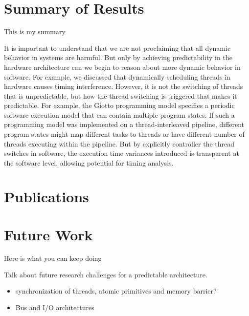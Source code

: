 \section{Summary of Results}

This is my summary

It is important to understand that we are not proclaiming that all dynamic behavior in systems are harmful. 
But only by achieving predictability in the hardware architecture can we begin to reason about more dynamic behavior in software.
For example, we discussed that dynamically scheduling threads in hardware causes timing interference. 
However, it is not the switching of threads that is unpredictable, but how the thread switching is triggered that makes it predictable.   
For example, the Giotto programming model specifies a periodic software execution model that can contain multiple program states. 
If such a programming model was implemented on a thread-interleaved pipeline, different program states might map different tasks to threads or have different number of threads executing within the pipeline.
But by explicitly controller the thread switches in software, the execution time variances introduced is transparent at the software level, allowing potential for timing analysis.


\section{Publications}

\section{Future Work}

Here is what you can keep doing

Talk about future research challenges for a predictable architecture.
\begin{itemize}
  \item synchronization of threads, atomic primitives and memory barrier?
  \item Bus and I/O architectures
\end{itemize}
